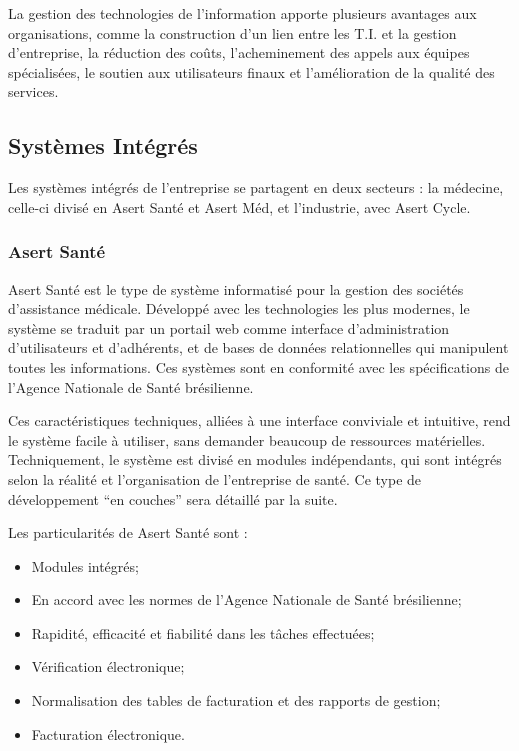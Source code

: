 La gestion des technologies de l'information apporte plusieurs avantages aux organisations, comme la construction d'un lien entre les T.I. et la gestion d'entreprise, la réduction des coûts, l'acheminement des appels aux équipes spécialisées, le soutien aux utilisateurs finaux  et l'amélioration de la qualité des services.

\subsection{Systèmes Intégrés}

Les systèmes intégrés de l'entreprise se partagent en deux secteurs : la médecine, celle-ci divisé en Asert Santé et Asert Méd, et l'industrie, avec Asert Cycle.

\subsubsection{Asert Santé}

Asert Santé est le type de système informatisé pour la gestion des sociétés d'assistance médicale. Développé avec les technologies les plus modernes, le système se traduit par un portail web comme interface d'administration d'utilisateurs et d'adhérents, et de bases de données relationnelles qui manipulent toutes les informations. Ces systèmes sont en conformité avec les spécifications de l'Agence Nationale de Santé brésilienne.

Ces caractéristiques techniques, alliées à une interface conviviale et intuitive, rend le système facile à utiliser, sans demander beaucoup de ressources matérielles. Techniquement, le système est divisé en modules indépendants, qui sont intégrés selon la réalité et l'organisation de l'entreprise de santé. Ce type de développement ``en couches'' sera détaillé par la suite. 

Les particularités de Asert Santé sont :

\begin{itemize}
\item Modules intégrés;
\item En accord avec les normes de l'Agence Nationale de Santé brésilienne;
\item Rapidité, efficacité et fiabilité dans les tâches effectuées;
\item Vérification électronique;
\item Normalisation des tables de facturation et des rapports de gestion;
\item Facturation électronique.
\end{itemize}

